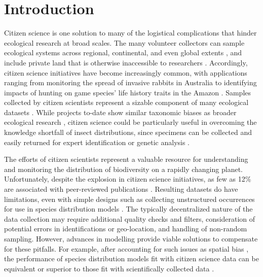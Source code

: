 \documentclass[preprint,final,times,12pt,3p]{elsarticle}
\begin{document}
\section{Introduction}
\label{S:1}

Citizen science is one solution to many of the logistical complications that hinder ecological research at broad scales. The many volunteer collectors can sample ecological systems across regional, continental, and even global extents \citep{Theobald2015}, and include private land that is otherwise inaccessible to researchers \citep{Pernat2020}. Accordingly, citizen science initiatives have become increasingly common, with applications ranging from monitoring the spread of invasive rabbits in Australia \citep{Roy-Dufresne2019} to identifying impacts of hunting on game species' life history traits in the Amazon \citep{ElBizri2020}. Samples collected by citizen scientists represent a sizable component of many ecological datasets \citep{Poisson2020}. While projects to-date show similar taxonomic biases as broader ecological research \citep{Theobald2015,Troudet2017}, citizen science could be particularly useful in overcoming the knowledge shortfall of insect distributions, since specimens can be collected and easily returned for expert identification or genetic analysis \citep{Ward2014,Pernat2020}.

The efforts of citizen scientists represent a valuable resource for understanding and monitoring the distribution of biodiversity on a rapidly changing planet. Unfortunately, despite the explosion in citizen science initiatives, as few as 12\% are associated with peer-reviewed publications \citep{Theobald2015}. Resulting datasets do have limitations, even with simple designs such as collecting unstructured occurrences for use in species distribution models \citep{Theobald2015,Steen2019,Duan2020,Henckel2020}. The typically decentralized nature of the data collection may require additional quality checks and filters, consideration of potential errors in identifications or geo-location, and handling of non-random sampling. However, advances in modelling provide viable solutions to compensate for these pitfalls. For example, after accounting for such issues as spatial bias \citep{Isaac2014,Steen2019,Johnston2020,Robinson2020}, the performance of species distribution models fit with citizen science data can be equivalent or superior to those fit with scientifically collected data \citep{Steen2019,Sumner2019,Henckel2020}. 
\end{document}
